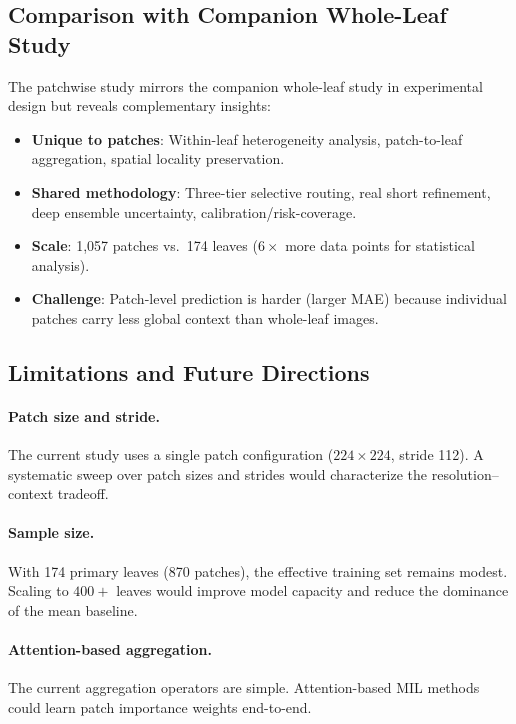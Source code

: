 \documentclass[11pt,a4paper]{article}
\begin{document}
\subsection{Comparison with Companion Whole-Leaf Study}

The patchwise study mirrors the companion whole-leaf study in experimental
design but reveals complementary insights:
\begin{itemize}[leftmargin=*,itemsep=2pt]
\item \textbf{Unique to patches}: Within-leaf heterogeneity analysis,
  patch-to-leaf aggregation, spatial locality preservation.
\item \textbf{Shared methodology}: Three-tier selective routing,
  real short refinement, deep ensemble uncertainty, calibration/risk-coverage.
\item \textbf{Scale}: 1{,}057 patches vs.\ 174 leaves ($6{\times}$
  more data points for statistical analysis).
\item \textbf{Challenge}: Patch-level prediction is harder (larger MAE)
  because individual patches carry less global context than whole-leaf images.
\end{itemize}

\subsection{Limitations and Future Directions}

\paragraph{Patch size and stride.}
The current study uses a single patch configuration ($224{\times}224$, stride 112).
A systematic sweep over patch sizes and strides would characterize the
resolution--context tradeoff.

\paragraph{Sample size.}
With 174 primary leaves (870 patches), the effective training set remains
modest. Scaling to $400{+}$ leaves would improve model capacity and reduce
the dominance of the mean baseline.

\paragraph{Attention-based aggregation.}
The current aggregation operators are simple. Attention-based MIL
methods~\cite{ilse2018attention} could learn patch importance weights
end-to-end.
\end{document}
